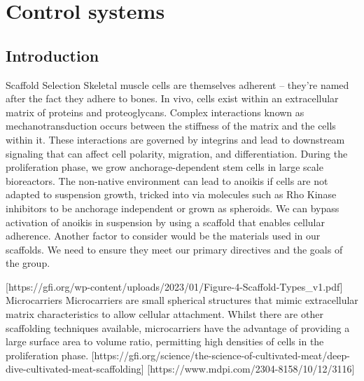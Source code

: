\newpage
\section{Control systems}

\subsection{Introduction}

Scaffold Selection
Skeletal muscle cells are themselves adherent – they’re named after the fact they adhere to bones. In vivo, cells exist within an extracellular matrix of proteins and proteoglycans. Complex interactions known as mechanotransduction occurs between the stiffness of the matrix and the cells within it. These interactions are governed by integrins and lead to downstream signaling that can affect cell polarity, migration, and differentiation.
During the proliferation phase, we grow anchorage-dependent stem cells in large scale bioreactors. The non-native environment can lead to anoikis if cells are not adapted to suspension growth, tricked into via molecules such as Rho Kinase inhibitors to be anchorage independent or grown as spheroids. We can bypass activation of anoikis in suspension by using a scaffold that enables cellular adherence.
Another factor to consider would be the materials used in our scaffolds. We need to ensure they meet our primary directives and the goals of the group.
 
[https://gfi.org/wp-content/uploads/2023/01/Figure-4-Scaffold-Types_v1.pdf]
Microcarriers
Microcarriers are small spherical structures that mimic extracellular matrix characteristics to allow cellular attachment. Whilst there are other scaffolding techniques available, microcarriers have the advantage of providing a large surface area to volume ratio, permitting high densities of cells in the proliferation phase.
[https://gfi.org/science/the-science-of-cultivated-meat/deep-dive-cultivated-meat-scaffolding]
[https://www.mdpi.com/2304-8158/10/12/3116]
 
